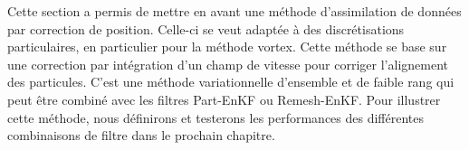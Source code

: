 Cette section a permis de mettre en avant une méthode d'assimilation de données par correction de position. Celle-ci se veut adaptée à des discrétisations particulaires, en particulier pour la méthode vortex. Cette méthode se base sur une correction par intégration d'un champ de vitesse pour corriger l'alignement des particules. C'est une méthode variationnelle d'ensemble et de faible rang qui peut être combiné avec les filtres Part-EnKF ou Remesh-EnKF. Pour illustrer cette méthode, nous définirons et testerons les performances des différentes combinaisons de filtre dans le prochain chapitre.